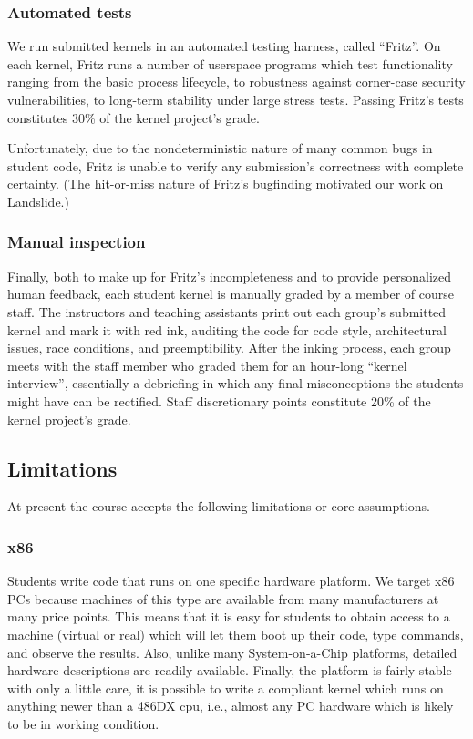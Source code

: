 \subsubsection{Automated tests}
We run submitted kernels in an automated testing harness, called ``Fritz''.
On each kernel, Fritz runs a number of userspace programs which test functionality ranging from the basic process lifecycle, to robustness against corner-case security vulnerabilities, to long-term stability under large stress tests.
Passing Fritz's tests constitutes 30\% of the kernel project's grade.

Unfortunately, due to the nondeterministic nature of many common bugs in student code, Fritz is unable to verify any submission's correctness with complete certainty.
(The hit-or-miss nature of Fritz's bugfinding motivated our work on Landslide.)

\subsubsection{Manual inspection}
Finally, both to make up for Fritz's incompleteness and to provide personalized human feedback, each student kernel is manually graded by a member of course staff.
The instructors and teaching assistants print out each group's submitted kernel and mark it with red ink, auditing the code for code style, architectural issues, race conditions, and preemptibility.
After the inking process, each group meets with the staff member who graded them for an hour-long ``kernel interview'', essentially a debriefing in which any final misconceptions the students might have can be rectified.
Staff discretionary points constitute 20\% of the kernel project's grade.

\subsection{Limitations}

At present the course accepts the following limitations
or core assumptions.

\subsubsection{x86}

Students write code that runs on one specific
hardware platform.
We target x86 PCs because machines of this type are
available from many manufacturers at many price points.
This means that it is easy for students to obtain access
to a machine (virtual or real) which will let them boot
up their code, type commands, and observe the results.
Also, unlike many System-on-a-Chip platforms,
detailed hardware descriptions are readily available.
Finally, the platform is fairly stable---with only a
little care, it is possible to write a compliant
kernel which runs on anything newer than a 486DX cpu,
i.e., almost any PC hardware which is likely to be in
working condition.

